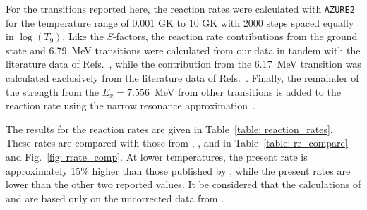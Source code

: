 For the transitions reported here, the reaction rates were calculated with \texttt{AZURE2} for the temperature range of 0.001 GK to 10 GK with 2000 steps spaced equally in $\log(T_{9})$. Like the $S$-factors, the reaction rate contributions from the ground state and 6.79~MeV transitions were calculated from our data in tandem with the literature data of Refs.~\cite{Formicola2004, Imbriani2005, Marta2008, Marta2011, Runkle2005, Schroder1987, Li2016, Wagner2018}, while the contribution from the 6.17~MeV transition was calculated exclusively from the literature data of Refs.~\cite{Runkle2005, Imbriani2005, Schroder1987}. Finally, the remainder of the strength from the $E_{x}= 7.556$~MeV from other transitions is added to the reaction rate using the narrow resonance approximation~\cite{RevModPhys.20.236}.

The results for the reaction rates are given in Table~\ref{table: reaction_rates}. These rates are compared with those from \citet{Caughlan1988}, \citet{Angulo1999}, and \citet{Imbriani2005} in Table~\ref{table: rr_compare} and Fig.~\ref{fig: rrate_comp}. At lower temperatures, the present rate is approximately 15$\%$ higher than those published by \citet{Imbriani2005}, while the present rates are lower than the other two reported values. It be considered that the calculations of \citet{Caughlan1988} and \citet{Angulo1999} are based only on the uncorrected data from \citet{Schroder1987}. 


